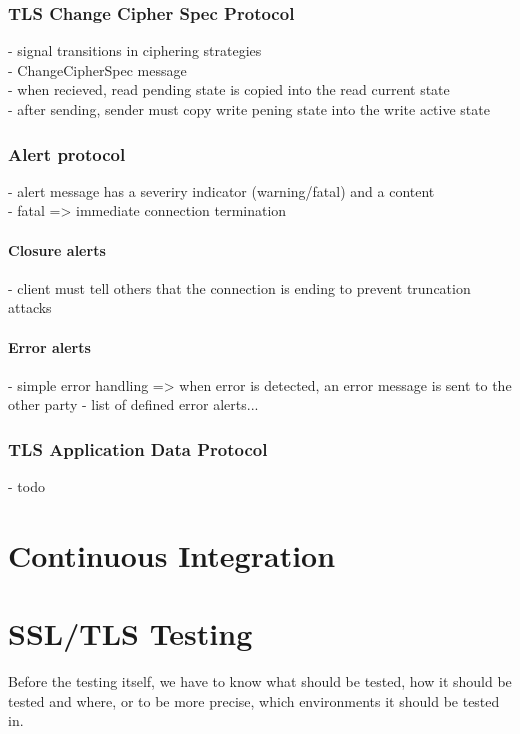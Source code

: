 \subsection{TLS Change Cipher Spec Protocol}
- signal transitions in ciphering strategies \\
- ChangeCipherSpec message \\
- when recieved, read pending state is copied into the read current state \\
- after sending, sender must copy write pening state into the write active state
\subsection{Alert protocol}
- alert message has a severiry indicator (warning/fatal) and a content \\
- fatal => immediate connection termination
\subsubsection{Closure alerts}
- client must tell others that the connection is ending to prevent truncation
attacks
\subsubsection{Error alerts}
- simple error handling => when error is detected, an error message is sent
to the other party
- list of defined error alerts...
\subsection{TLS Application Data Protocol}
- todo

\chapter{Continuous Integration}

\chapter {SSL/TLS Testing}
    Before the testing itself, we have to know what should be tested, how it
    should be tested and where, or to be more precise, which environments it
    should be tested in.

